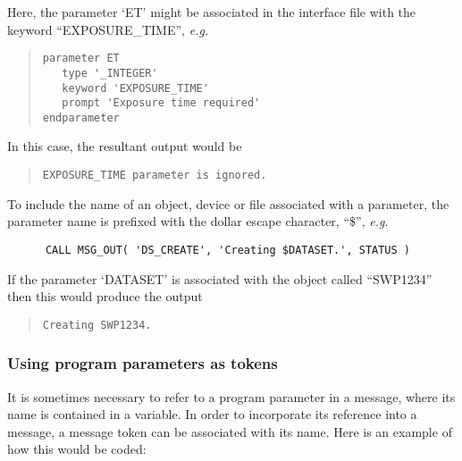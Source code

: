 \begin {sloppypar}
Here, the parameter `ET' might be associated in the interface file 
with the keyword ``EXPOSURE\_TIME'', {\em e.g.}
\end {sloppypar}

\begin {quote}
\begin {small}
\begin{verbatim}
parameter ET
   type '_INTEGER'
   keyword 'EXPOSURE_TIME'
   prompt 'Exposure time required'
endparameter
\end{verbatim}
\end {small}
\end {quote}

In this case, the resultant output would be

\begin {quote}
\begin {small}
\begin{verbatim}
EXPOSURE_TIME parameter is ignored.
\end{verbatim}
\end {small}
\end {quote}

To include the name of an object, device or file associated with a parameter, 
the parameter name is prefixed with the dollar escape character, ``\$'', {\em e.g.}

\begin {small}
\begin{verbatim}
      CALL MSG_OUT( 'DS_CREATE', 'Creating $DATASET.', STATUS )
\end{verbatim}
\end {small}

If the parameter `DATASET' is associated with the object called ``SWP1234'' 
then this would produce the output

\begin {quote}
\begin {small}
\begin{verbatim}
Creating SWP1234.
\end{verbatim}
\end {small}
\end {quote}


\subsubsection {Using program parameters as tokens}

It is sometimes necessary to refer to a program parameter in a message, where
its name is contained in a variable. 
In order to incorporate its reference into a message, a message token can be
associated with its name. 
Here is an example of how this would be coded:

